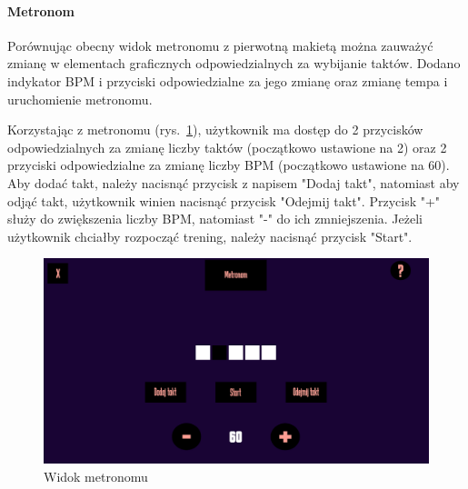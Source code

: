 \paragraph{Metronom}
Porównując obecny widok metronomu z pierwotną makietą można zauważyć zmianę w elementach graficznych odpowiedzialnych za wybijanie taktów. Dodano indykator BPM i przyciski odpowiedzialne za jego zmianę oraz zmianę tempa i uruchomienie metronomu.

Korzystając z metronomu (rys.~\ref{fig:Metronom}), użytkownik ma dostęp do 2 przycisków odpowiedzialnych za zmianę liczby taktów (początkowo ustawione na 2) oraz 2 przyciski odpowiedzialne za zmianę liczby BPM (początkowo ustawione na 60). Aby dodać takt, należy nacisnąć przycisk z napisem "Dodaj takt", natomiast aby odjąć takt, użytkownik winien nacisnąć przycisk "Odejmij takt". Przycisk "+" służy do zwiększenia liczby BPM, natomiast "-" do ich zmniejszenia. Jeżeli użytkownik chciałby rozpocząć trening, należy nacisnąć przycisk "Start".

\begin{figure}[htb]
	\centering
	\includegraphics[width=.6\linewidth]{rysB/METRO.png}
	\caption{Widok metronomu} \label{fig:Metronom}
\end{figure}


